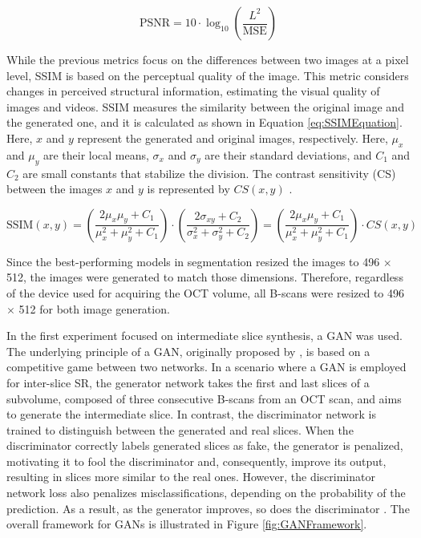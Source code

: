 \begin{equation}
	\text{PSNR} = 10 \cdot \log_{10} \left( \frac{L^2}{\text{MSE}} \right)
	\label{eq:PSNREquation}
\end{equation}

While the previous metrics focus on the differences between two images at a pixel level, SSIM is based on the perceptual quality of the image. This metric considers changes in perceived structural information, estimating the visual quality of images and videos. SSIM measures the similarity between the original image and the generated one, and it is calculated as shown in Equation \ref{eq:SSIMEquation}. Here, $x$ and $y$ represent the generated and original images, respectively. Here, $\mu_{x}$ and $\mu_{y}$ are their local means, $\sigma_{x}$ and $\sigma_{y}$ are their standard deviations, and $C_{1}$ and $C_{2}$ are small constants that stabilize the division. The contrast sensitivity (CS) between the images $x$ and $y$ is represented by $CS(x,y)$ \parencite{Sara2019}.

\begin{equation}
	\text{SSIM}(x, y) = \left( \frac{2\mu_x \mu_y + C_1}{\mu_x^2 + \mu_y^2 + C_1} \right) \cdot \left( \frac{2\sigma_{xy} + C_2}{\sigma_x^2 + \sigma_y^2 + C_2} \right) = \left( \frac{2\mu_x \mu_y + C_1}{\mu_x^2 + \mu_y^2 + C_1} \right) \cdot CS(x, y)
	\label{eq:SSIMEquation} 
\end{equation}

Since the best-performing models in segmentation resized the images to 496 $\times$ 512, the images were generated to match those dimensions. Therefore, regardless of the device used for acquiring the OCT volume, all B-scans were resized to 496 $\times$ 512 for both image generation.
\par
In the first experiment focused on intermediate slice synthesis, a GAN was used. The underlying principle of a GAN, originally proposed by \textcite{Goodfellow2014}, is based on a competitive game between two networks. In a scenario where a GAN is employed for inter-slice SR, the generator network takes the first and last slices of a subvolume, composed of three consecutive B-scans from an OCT scan, and aims to generate the intermediate slice. In contrast, the discriminator network is trained to distinguish between the generated and real slices. When the discriminator correctly labels generated slices as fake, the generator is penalized, motivating it to fool the discriminator and, consequently, improve its output, resulting in slices more similar to the real ones. However, the discriminator network loss also penalizes misclassifications, depending on the probability of the prediction. As a result, as the generator improves, so does the discriminator \parencite{Goodfellow2020}. The overall framework for GANs is illustrated in Figure \ref{fig:GANFramework}.

